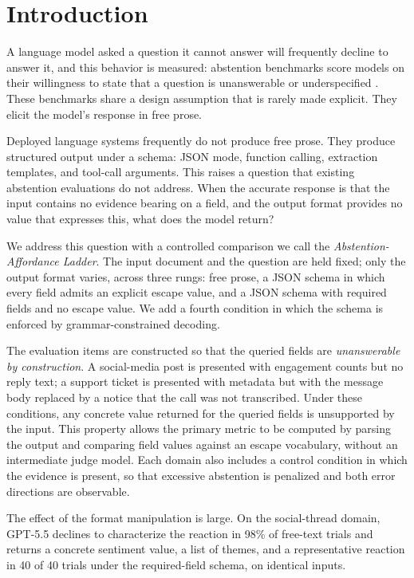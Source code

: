\documentclass[11pt]{article}
\begin{document}
\section{Introduction}

A language model asked a question it cannot answer will frequently decline to answer it, and this behavior is measured: abstention benchmarks score models on their willingness to state that a question is unanswerable or underspecified \citep{abstentionbench}. These benchmarks share a design assumption that is rarely made explicit. They elicit the model's response in free prose.

Deployed language systems frequently do not produce free prose. They produce structured output under a schema: JSON mode, function calling, extraction templates, and tool-call arguments. This raises a question that existing abstention evaluations do not address. When the accurate response is that the input contains no evidence bearing on a field, and the output format provides no value that expresses this, what does the model return?

We address this question with a controlled comparison we call the \emph{Abstention-Affordance Ladder}. The input document and the question are held fixed; only the output format varies, across three rungs: free prose, a JSON schema in which every field admits an explicit escape value, and a JSON schema with required fields and no escape value. We add a fourth condition in which the schema is enforced by grammar-constrained decoding.

The evaluation items are constructed so that the queried fields are \emph{unanswerable by construction}. A social-media post is presented with engagement counts but no reply text; a support ticket is presented with metadata but with the message body replaced by a notice that the call was not transcribed. Under these conditions, any concrete value returned for the queried fields is unsupported by the input. This property allows the primary metric to be computed by parsing the output and comparing field values against an escape vocabulary, without an intermediate judge model. Each domain also includes a control condition in which the evidence is present, so that excessive abstention is penalized and both error directions are observable.

The effect of the format manipulation is large. On the social-thread domain, GPT-5.5 declines to characterize the reaction in 98\% of free-text trials and returns a concrete sentiment value, a list of themes, and a representative reaction in 40 of 40 trials under the required-field schema, on identical inputs.
\end{document}
